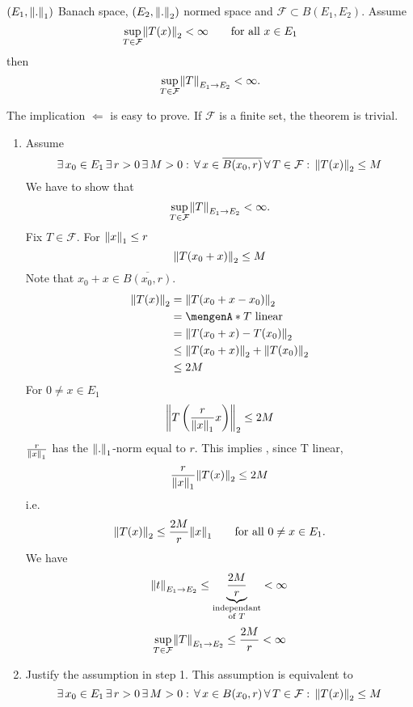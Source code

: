 \begin{theorem}
	$(E_1,\norm{.}_1)$ Banach space, $(E_2,\norm{.}_2)$ normed space and $\mathcal{F} \subset B(E_1,E_2)$. Assume
	\[
		\sup\limits_{T \in \mathcal{F}}\norm{T(x)}_2 < \infty \qquad \text{for all } x \in E_1
	\]
	then
	\[
		\sup\limits_{T \in \mathcal{F}}\norm{T}_{E_1 \to E_2} < \infty.
	\]
	\end{theorem}
	\begin{bemerkung}
		The implication $\Leftarrow$ is easy to prove. If $\mathcal{F}$ is a finite set, the theorem is trivial.
	\end{bemerkung}
	\begin{beweis}
		\begin{enumerate}[step 1:]
			\item Assume 
			\[
				\exists\,x_0 \in E_1\, \exists\, r >0 \,\exists\, M>0: \,\forall\, x \in \overline{B(x_0,r)} \, \forall\,  T \in \mathcal{F}: \,\norm{T(x)}_2 \leq M
			\]
			We have to show that 
			\[
				\sup\limits_{T \in \mathcal{F}} \norm{T}_{E_1 \to E_2} < \infty.
			\]
			Fix $T \in \mathcal{F}$. For $\norm{x}_1 \leq r$
			\[
				\norm{T(x_0+x)}_2 \leq M
			\]
			Note that $x_0+x \in \overline{B(x_0,r)}$.
			\begin{align*}
				\norm{T(x)}_2 &= \norm{T(x_0+x-x_0)}_2 \\ &= \set{T \text{ linear}} \\ &= \norm{T(x_0 + x)-T(x_0)}_2 \\ &\leq \norm{T(x_0+x)}_2 +
				\norm{T(x_0)}_2 \\ &\leq 2M
			\end{align*}
			For $0 \neq x \in E_1$ 
			\[
				\norm{T \left( \frac{r}{\norm{x}_1} x \right)}_2 \leq 2M
			\]
			$\frac{r}{\norm{x}_1} $ has the $\norm{.}_1$-norm equal to $r$. This implies , since T linear,
			\[
				\frac{r}{\norm{x}_1} \norm{T(x)}_2 \leq 2M
			\]
			i.e.
			\[
				\norm{T(x)}_2 \leq \frac{2M}{r}\norm{x}_1 \qquad \text{for all }0 \neq x \in E_1.
			\]
			We have
			\[
				\norm{t}_{E_1 \to E_2} \leq \underset{\substack{\text{independant}\\ \text{of }T}}{\underbrace{\frac{2M}{r}}} < \infty
			\]
			\[
				\sup\limits_{T \in \mathcal{F}}\norm{T}_{E_1 \to E_2} \leq \frac{2M}{r} < \infty
			\]
			\item Justify the assumption in step 1. This assumption is equivalent to
			\[
			\exists\,x_0 \in E_1\, \exists\, r >0 \,\exists\, M>0: \,\forall\, x \in B(x_0,r) \, \forall\,  T \in \mathcal{F}: \,\norm{T(x)}_2 \leq M	
\]
\end{enumerate}
\end{beweis}
